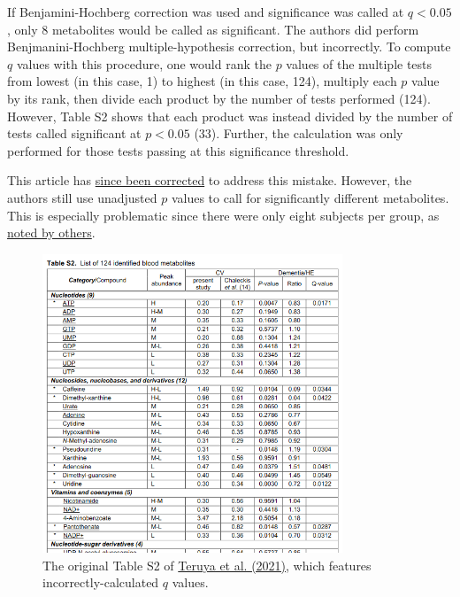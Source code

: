 \documentclass[letterpaper, 12pt]{article}
\begin{document}
If Benjamini-Hochberg correction was used and significance was called at $q < 0.05$, only 8 metabolites would be called as significant. The authors did perform Benjmanini-Hochberg multiple-hypothesis correction, but incorrectly. To compute $q$ values with this procedure, one would rank the $p$ values of the multiple tests from lowest (in this case, 1) to highest (in this case, 124), multiply each $p$ value by its rank, then divide each product by the number of tests performed (124). However, Table S2 shows that each product was instead divided by the number of tests called significant at $p < 0.05$ (33). Further, the calculation was only performed for those tests passing at this significance threshold.

This article has \href{https://doi.org/10.1073/pnas.2419538121}{since been corrected} to address this mistake. However, the authors still use unadjusted $p$ values to call for significantly different metabolites. This is especially problematic since there were only eight subjects per group, as \href{https://doi.org/10.1073/pnas.2118654119}{noted by others}.

\pagebreak

\begin{figure}[h!tbp]
    \centering
    \includegraphics[width=0.8\textwidth]{img/multiple_hypothesis_correction/image-1715611965675.png}
    \caption*{The original Table S2 of \href{https://doi.org/10.1073/pnas.2022857118}{Teruya et al. (2021)}, which features incorrectly-calculated $q$ values.}
\end{figure}
\end{document}
